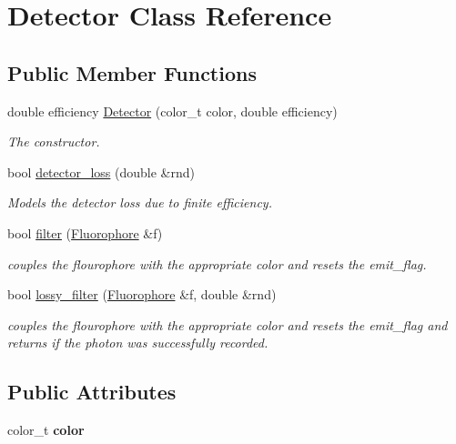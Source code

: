 \hypertarget{classDetector}{}\section{Detector Class Reference}
\label{classDetector}
\subsection*{Public Member Functions}
\begin{DoxyCompactItemize}
\item 
\mbox{\label{classDetector_a0edb82dcfccbde7d8e08db22dd74c60c}} 
double efficiency \hyperlink{classDetector_a0edb82dcfccbde7d8e08db22dd74c60c}{Detector} (color\+\_\+t color, double efficiency)
\begin{DoxyCompactList}\small\item\em The constructor. \end{DoxyCompactList}\item 
bool \hyperlink{classDetector_a51d97a31b186129a7aac2b250352f22e}{detector\+\_\+loss} (double \&rnd)
\begin{DoxyCompactList}\small\item\em Models the detector loss due to finite efficiency. \end{DoxyCompactList}\item 
bool \hyperlink{classDetector_aafefda7f530ec8646d1591d7c019d72b}{filter} (\hyperlink{classFluorophore}{Fluorophore} \&f)
\begin{DoxyCompactList}\small\item\em couples the flourophore with the appropriate color and resets the emit\+\_\+flag. \end{DoxyCompactList}\item 
bool \hyperlink{classDetector_ae1b633f64a917029a0915c885eebd9a3}{lossy\+\_\+filter} (\hyperlink{classFluorophore}{Fluorophore} \&f, double \&rnd)
\begin{DoxyCompactList}\small\item\em couples the flourophore with the appropriate color and resets the emit\+\_\+flag and returns if the photon was successfully recorded. \end{DoxyCompactList}\end{DoxyCompactItemize}
\subsection*{Public Attributes}
\begin{DoxyCompactItemize}
\item 
\mbox{\label{classDetector_a12113b286a0abdf56556712709df81bc}} 
color\+\_\+t {\bfseries color}
\end{DoxyCompactItemize}



